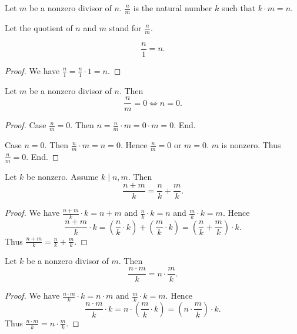 \documentclass[../../arithmetic.tex]{subfiles}
\begin{document}
  \begin{forthel}
    \begin{definition}
      Let $m$ be a nonzero divisor of $n$.
      $\frac{n}{m}$ is the natural number $k$ such that $k \cdot m = n$.
    \end{definition}

    Let the quotient of $n$ and $m$ stand for $\frac{n}{m}$.

    \begin{proposition}\label{Arithmetic_03_05_479904}
      \[ \frac{n}{1} = n. \]
    \end{proposition}
    \begin{proof}
      We have $\frac{n}{1} = \frac{n}{1} \cdot 1 = n$.
    \end{proof}

    \begin{proposition}\label{Arithmetic_03_05_471851}
      Let $m$ be a nonzero divisor of $n$.
      Then \[ \frac{n}{m} = 0 \iff n = 0. \]
    \end{proposition}
    \begin{proof}
      Case $\frac{n}{m} = 0$.
        Then $n = \frac{n}{m} \cdot m = 0 \cdot m = 0$.
      End.

      Case $n = 0$.
        Then $\frac{n}{m} \cdot m = n = 0$.
        Hence $\frac{n}{m} = 0$ or $m = 0$.
        $m$ is nonzero.
        Thus $\frac{n}{m} = 0$.
      End.
    \end{proof}

    \begin{proposition}\label{Arithmetic_03_05_363442}
      Let $k$ be nonzero.
      Assume $k \mid n,m$.
      Then \[ \frac{n + m}{k} = \frac{n}{k} + \frac{m}{k}. \]
    \end{proposition}
    \begin{proof}
      We have $\frac{n + m}{k} \cdot k = n + m$ and $\frac{n}{k} \cdot k = n$ and $\frac{m}{k} \cdot k = m$.
      Hence
      \[  \frac{n + m}{k} \cdot k
          = \left( \frac{n}{k} \cdot k \right) + \left( \frac{m}{k} \cdot k \right)
          = \left( \frac{n}{k} + \frac{m}{k} \right) \cdot k. \]
      Thus $\frac{n + m}{k} = \frac{n}{k} + \frac{m}{k}$.
    \end{proof}

    \begin{proposition}\label{Arithmetic_03_05_170600}
      Let $k$ be a nonzero divisor of $m$.
      Then \[ \frac{n \cdot m}{k} = n \cdot \frac{m}{k}. \]
    \end{proposition}
    \begin{proof}
      We have $\frac{n \cdot m}{k} \cdot k = n \cdot m$ and $\frac{m}{k} \cdot k = m$.
      Hence
      \[  \frac{n \cdot m}{k} \cdot k
          = n \cdot \left( \frac{m}{k} \cdot k \right)
          = \left( n \cdot \frac{m}{k} \right) \cdot k. \]
      Thus $\frac{n \cdot m}{k} = n \cdot \frac{m}{k}$.
    \end{proof}


\end{forthel}
\end{document}
